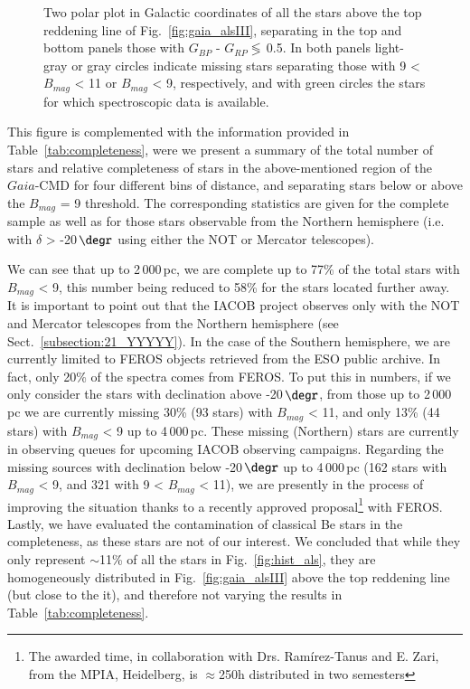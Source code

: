 \documentclass{aa}
\begin{document}
\begin{figure}[!t]
\centering
{}
\caption{Two polar plot in Galactic coordinates of all the stars above the top reddening line of Fig.~\ref{fig:gaia_alsIII}, separating in the top and bottom panels those with $G_{BP}$ - $G_{RP}\mathop{\lessgtr}$\,0.5. In both panels light-gray or gray circles indicate missing stars separating those with 9 < $B_{mag}$ < 11 or $B_{mag}$ < 9, respectively, and with green circles the stars for which spectroscopic data is available.} 
\label{fig:gaia_lb_als}
\end{figure}

This figure is complemented with the information provided in Table~\ref{tab:completeness}, were we present a summary of the total number of stars and relative completeness of stars in the above-mentioned region of the $Gaia$-CMD for four different bins of distance, and separating stars below or above the $B_{mag}$ = 9 threshold. The corresponding statistics are given for the complete sample as well as for those stars observable from the Northern hemisphere (i.e. with $\delta$ > -20\,$\degr$ using either the NOT or Mercator telescopes).

We can see that up to 2\,000\,pc, we are complete up to 77\% of the total stars with $B_{mag}$ < 9, this number being reduced to 58\% for the stars located further away. It is important to point out that the IACOB project observes only with the NOT and Mercator telescopes from the Northern hemisphere (see Sect.~\ref{subsection:21_YYYYY}). In the case of the Southern hemisphere, we are currently limited to FEROS objects retrieved from the ESO public archive. In fact, only 20\% of the spectra comes from FEROS. To put this in numbers, if we only consider the stars with declination above -20\,$\degr$, from those up to 2\,000\,pc we are currently missing 30\% (93 stars) with $B_{mag}$ < 11, and only 13\% (44 stars) with $B_{mag}$ < 9 up to 4\,000\,pc. These missing (Northern) stars are currently in observing queues for upcoming IACOB observing campaigns. Regarding the missing sources with declination below -20\,$\degr$ up to 4\,000\,pc (162 stars with $B_{mag}$ < 9, and 321 with 9 < $B_{mag}$ < 11), we are presently in the process of improving the situation thanks to a recently approved proposal\footnote{The awarded time, in collaboration with Drs. Ram\'irez-Tanus and E. Zari, from the MPIA, Heidelberg, is $\approx$250h distributed in two semesters} with FEROS. Lastly, we have evaluated the contamination of classical Be stars in the completeness, as these stars are not of our interest. We concluded that while they only represent $\sim$11\% of all the stars in Fig.~\ref{fig:hist_als}, they are homogeneously distributed in Fig.~\ref{fig:gaia_alsIII} above the top reddening line (but close to the it), and therefore not varying the results in Table~\ref{tab:completeness}.
\end{document}
